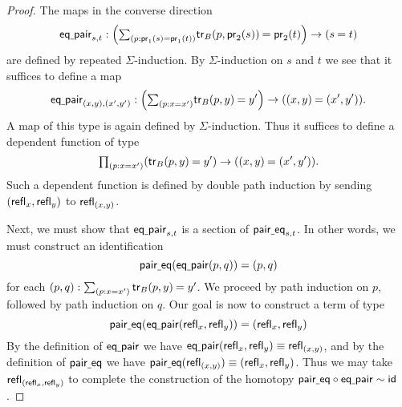 \begin{proof}
The maps in the converse direction
\begin{equation*}
\mathsf{eq\usc{}pair}_{s,t} : \Big(\sm{p:\proj 1(s)=\proj 1(t)}\id{\mathsf{tr}_B(p,\proj 2(s))}{\proj 2(t)}\Big)\to(\id{s}{t})
\end{equation*}
are defined by repeated $\Sigma$-induction. By $\Sigma$-induction on $s$ and $t$  we see that it suffices to define a map
\begin{equation*}
\mathsf{eq\usc{}pair}_{(x,y),(x',y')} : \Big(\sm{p:x=x'}\id{\mathsf{tr}_B(p,y)}{y'}\Big)\to(\id{(x,y)}{(x',y')}).
\end{equation*}
A map of this type is again defined by $\Sigma$-induction. Thus it suffices to define a dependent function of type
\begin{equation*}
\prd{p:x=x'} (\id{\mathsf{tr}_B(p,y)}{y'}) \to (\id{(x,y)}{(x',y')}).
\end{equation*}
Such a dependent function is defined by double path induction by sending ${\mathopen{}(\mathsf{refl}_{x},\mathsf{refl}_{y})\mathclose{}}$ to $\mathsf{refl}_{{\mathopen{}(x,y)\mathclose{}}}$.

Next, we must show that $\mathsf{eq\underline{\ }{}pair}_{s,t}$ is a section of $\mathsf{pair\underline{\ }{}eq}_{s,t}$. In other words, we must construct an identification
\begin{equation*}
\mathsf{pair\underline{\ }{}eq}(\mathsf{eq\underline{\ }{}pair}(p,q))={\mathopen{}(p,q)\mathclose{}}
\end{equation*}
for each $\pairr{p,q}:\sm{p:x=x'}\id{\mathsf{tr}_B(p,y)}{y'}$. We proceed by path induction on $p$, followed by path induction on $q$. Our goal is now to construct a term of type
\begin{equation*}
\mathsf{pair\underline{\ }{}eq}(\mathsf{eq\underline{\ }{}pair}{\mathopen{}(\mathsf{refl}_{x},\mathsf{refl}_{y})\mathclose{}})={\mathopen{}(\mathsf{refl}_{x},\mathsf{refl}_{y})\mathclose{}}
\end{equation*}
By the definition of $\mathsf{eq\underline{\ }{}pair}$ we have $\mathsf{eq\underline{\ }{}pair}{\mathopen{}(\mathsf{refl}_{x},\mathsf{refl}_{y})\mathclose{}}\equiv \mathsf{refl}_{{\mathopen{}(x,y)\mathclose{}}}$, and by the definition of $\mathsf{pair\underline{\ }{}eq}$ we have $\mathsf{pair\underline{\ }{}eq}(\mathsf{refl}_{{\mathopen{}(x,y)\mathclose{}}})\equiv{\mathopen{}(\mathsf{refl}_{x},\mathsf{refl}_{y})\mathclose{}}$. Thus we may take $\mathsf{refl}_{{\mathopen{}(\mathsf{refl}_{x},\mathsf{refl}_{y})\mathclose{}}}$ to complete the construction of the homotopy $\mathsf{pair\underline{\ }{}eq}\circ\mathsf{eq\underline{\ }{}pair}\sim\mathsf{id}_{}$.


\end{proof}
